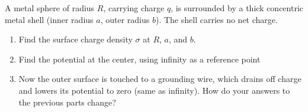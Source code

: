 \documentclass{homework}
\begin{document}
\begin{homeworkProblem}[Problem 2.38]

  A metal sphere of radius $R$, carrying charge $q$, is surrounded by a thick concentric metal shell (inner radius $a$, outer radius $b$). The shell carries no net charge.

  \begin{enumerate}
    \item Find the surface charge density $\sigma$ at $R$, $a$, and $b$.
    \item Find the potential at the center, using infinity as a reference point
    \item Now the outer surface is touched to a grounding wire, which drains off charge and lowers its potential to zero (same as infinity). How do your answers to the previous parts change?
  \end{enumerate}

  \vspace{.2in}

  \problemAnswer{ %

}
\end{homeworkProblem}
\end{document}
